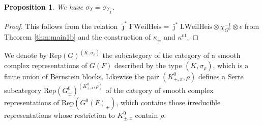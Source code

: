 \documentclass{article}
\newtheorem{pro}[thm]{Proposition}
\theoremstyle{definition}
\numberwithin{equation}{subsection}
\renewcommand{\-}{\hyp{}}
\begin{document}
\begin{pro}\label{pro:comparisonKimYu}
	We have $\sigma_\Upsilon = \sigma_{\Upsilon_\chi}$.
\end{pro}
\begin{proof}
	This follows from the relation $\tilde\jmath^*\mathrm{FWeilHeis} = \bar\jmath^*\mathrm{LWeilHeis} \otimes \chi_{G^0}^{-1} \otimes \epsilon$ from Theorem \ref{thm:main1b} and the construction of $\kappa_{\pm}$ and $\kappa^{\mathrm{nt}}$.
\end{proof}

We denote by $\mathrm{Rep}(G)^{(K, \sigma_\rho)}$ the subcategory of the category of a smooth complex representations of $G(F)$ described by the type $(K, \sigma_\rho)$, which is a finite union of Bernstein blocks. Likewise the pair $(K^0_{\pm, x}, \rho)$ defines a Serre subcategory  $\mathrm{Rep}(G^0_{\pm})^{(K^0_{\pm, x}, \rho)}$ of the category of smooth complex representations of $\mathrm{Rep}(G^0(F)_{\pm})$, which contains those irreducible representations whose restriction to $K^0_{\pm, x}$ contain $\rho$.
\end{document}
